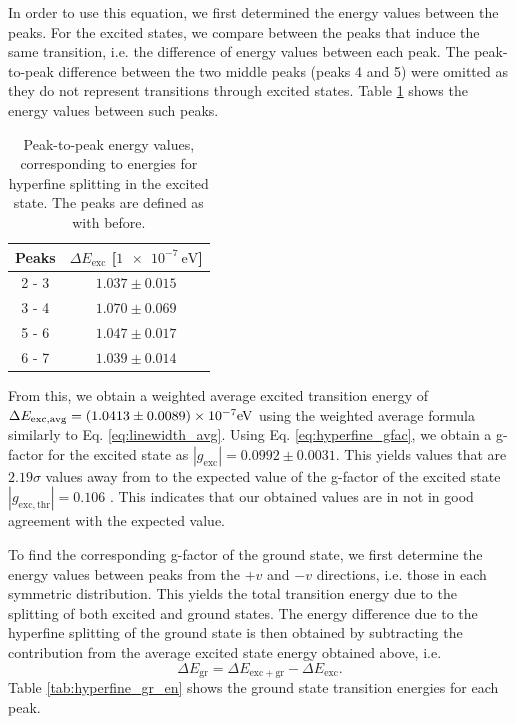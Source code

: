 \documentclass[a4paper]{report}
\numberwithin{equation}{section}
\begin{document}
In order to use this equation, we first determined the energy values between the peaks. For the excited states, we compare between the 
peaks that induce the same transition, i.e. the difference of energy values between each peak. The peak-to-peak difference between the 
two middle peaks (peaks 4 and 5) were omitted as they do not represent transitions through excited states. Table \ref{tab:hyperfine_exc_en} shows the energy values between such peaks.  

\begin{table}[!ht]
    \centering
    \begin{tabular}{|c|c|}
    \hline
        Peaks & $\Delta E_\mathrm{exc}$ [$\SI{1e-7}{\electronvolt}$] \\ \hline
        2 - 3 & $1.037 \pm 0.015$ \\ \hline
        3 - 4 & $1.070 \pm 0.069$\\ \hline
        5 - 6 & $1.047 \pm 0.017$ \\ \hline
        6 - 7 & $1.039 \pm 0.014$ \\ \hline
    \end{tabular}
    \caption{Peak-to-peak energy values, corresponding to energies for hyperfine splitting in the excited state. The peaks are 
    defined as with before.}
    \label{tab:hyperfine_exc_en}
\end{table}

From this, we obtain a weighted average excited transition energy of $\Delta E_\mathrm{exc, avg} = (1.0413 \pm 0.0089)\times 10^{-7} \si[]{\electronvolt}$ 
using the weighted average formula similarly to Eq. \ref{eq:linewidth_avg}. Using Eq. \ref{eq:hyperfine_gfac}, we obtain a g-factor for the excited state as $| g_\mathrm{exc} | = 0.0992 \pm 0.0031$.
This yields values that are $2.19\sigma$ values away from to the expected value of 
the g-factor of the excited state $| g_\mathrm{exc, thr} | = 0.106$ \cite{VANIN2007}. This indicates that our obtained 
values are in not in good agreement with the expected value.\par 

To find the corresponding g-factor of the ground state, we first determine the energy values between peaks from the $+v$ and $-v$
directions, i.e. those in each symmetric distribution. This yields the total transition energy due to the 
splitting of both excited and ground states. The energy difference due to the hyperfine splitting of the ground state is then obtained by 
subtracting the contribution from the average excited state energy obtained above, i.e.
\begin{equation}
    \Delta E_{\mathrm{gr}} = \Delta E_{\mathrm{exc + gr}} - \Delta E_{\mathrm{exc}} . 
\end{equation}
Table \ref{tab:hyperfine_gr_en} shows the ground state transition energies for each peak. 
\end{document}
